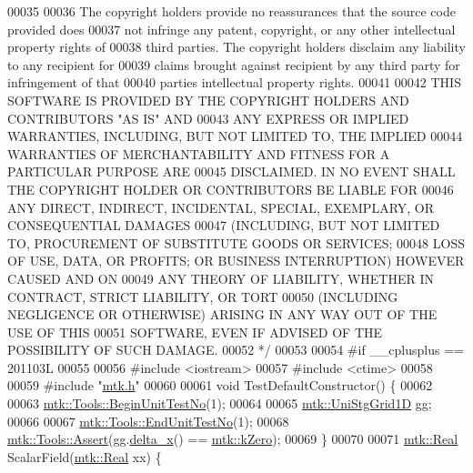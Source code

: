 \begin{DoxyCode}
00035 \textcolor{comment}{}
00036 \textcolor{comment}{The copyright holders provide no reassurances that the source code provided does}
00037 \textcolor{comment}{not infringe any patent, copyright, or any other intellectual property rights of}
00038 \textcolor{comment}{third parties. The copyright holders disclaim any liability to any recipient for}
00039 \textcolor{comment}{claims brought against recipient by any third party for infringement of that}
00040 \textcolor{comment}{parties intellectual property rights.}
00041 \textcolor{comment}{}
00042 \textcolor{comment}{THIS SOFTWARE IS PROVIDED BY THE COPYRIGHT HOLDERS AND CONTRIBUTORS "AS IS" AND}
00043 \textcolor{comment}{ANY EXPRESS OR IMPLIED WARRANTIES, INCLUDING, BUT NOT LIMITED TO, THE IMPLIED}
00044 \textcolor{comment}{WARRANTIES OF MERCHANTABILITY AND FITNESS FOR A PARTICULAR PURPOSE ARE}
00045 \textcolor{comment}{DISCLAIMED. IN NO EVENT SHALL THE COPYRIGHT HOLDER OR CONTRIBUTORS BE LIABLE FOR}
00046 \textcolor{comment}{ANY DIRECT, INDIRECT, INCIDENTAL, SPECIAL, EXEMPLARY, OR CONSEQUENTIAL DAMAGES}
00047 \textcolor{comment}{(INCLUDING, BUT NOT LIMITED TO, PROCUREMENT OF SUBSTITUTE GOODS OR SERVICES;}
00048 \textcolor{comment}{LOSS OF USE, DATA, OR PROFITS; OR BUSINESS INTERRUPTION) HOWEVER CAUSED AND ON}
00049 \textcolor{comment}{ANY THEORY OF LIABILITY, WHETHER IN CONTRACT, STRICT LIABILITY, OR TORT}
00050 \textcolor{comment}{(INCLUDING NEGLIGENCE OR OTHERWISE) ARISING IN ANY WAY OUT OF THE USE OF THIS}
00051 \textcolor{comment}{SOFTWARE, EVEN IF ADVISED OF THE POSSIBILITY OF SUCH DAMAGE.}
00052 \textcolor{comment}{*/}
00053 
00054 \textcolor{preprocessor}{#if \_\_cplusplus == 201103L}
00055 
00056 \textcolor{preprocessor}{#include <iostream>}
00057 \textcolor{preprocessor}{#include <ctime>}
00058 
00059 \textcolor{preprocessor}{#include "\hyperlink{mtk_8h}{mtk.h}"}
00060 
00061 \textcolor{keywordtype}{void} TestDefaultConstructor() \{
00062 
00063   \hyperlink{classmtk_1_1Tools_afc29ecaf337a13ed2e817d3890a5a441}{mtk::Tools::BeginUnitTestNo}(1);
00064 
00065   \hyperlink{classmtk_1_1UniStgGrid1D}{mtk::UniStgGrid1D} gg;
00066 
00067   \hyperlink{classmtk_1_1Tools_aba67d9dc35c9c1c49430fcc9ea035e03}{mtk::Tools::EndUnitTestNo}(1);
00068   \hyperlink{classmtk_1_1Tools_ac6804df469c94ab6a796fb64f1e44a89}{mtk::Tools::Assert}(gg.\hyperlink{classmtk_1_1UniStgGrid1D_a6e7173b01241632cf509496d66b9f74c}{delta\_x}() == \hyperlink{group__c01-roots_ga59a451a5fae30d59649bcda274fea271}{mtk::kZero});
00069 \}
00070 
00071 \hyperlink{group__c01-roots_gac080bbbf5cbb5502c9f00405f894857d}{mtk::Real} ScalarField(\hyperlink{group__c01-roots_gac080bbbf5cbb5502c9f00405f894857d}{mtk::Real} xx) \{

\end{DoxyCode}
